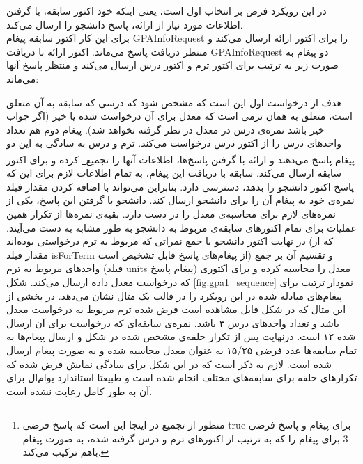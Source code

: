 در این رویکرد فرض بر انتخاب اول است، یعنی اینکه خود اکتور سابقه، با گرفتن اطلاعات مورد نیاز از ارائه، پاسخ دانشجو را ارسال می‌کند.\\
برای این کار اکتور سابقه پیغام GPAInfoRequest را برای اکتور ارائه ارسال می‌کند و منتظر دریافت پاسخ می‌ماند. اکتور ارائه با دریافت GPAInfoRequest دو پیغام به صورت زیر به ترتیب برای اکتور ترم و اکتور درس ارسال می‌کند و منتظر پاسخ آنها می‌ماند:
\begin{latin}
 \begin{description}
 \item[]
  \item[]
 \end{description}
 \end{latin}
هدف از درخواست اول این است که مشخص شود که  درسی که سابقه به آن متعلق است، متعلق به همان ترمی است که معدل برای‌ آن درخواست شده یا خیر (اگر جواب خیر باشد نمره‌ی درس در معدل در نظر گرفته نخواهد شد). پیغام دوم هم تعداد واحد‌های درس را از اکتور درس درخواست می‌کند. ترم و درس به سادگی به این دو پیغام پاسخ می‌دهند و ارائه با گرفتن پاسخ‌ها، اطلاعات آنها را تجمیع\footnote{منظور از تجمیع در اینجا این است که  پاسخ فرضی true برای پیغام  و پاسخ فرضی 3 برای پیغام  را که به ترتیب از اکتورهای ترم و درس گرفته شده، به صورت پیغام  باهم ترکیب می‌کند.} کرده و برای اکتور سابقه ارسال می‌کند.  سابقه با دریافت این پیغام، به تمام اطلاعات لازم برای این که پاسخ اکتور دانشجو را بدهد، دسترسی دارد. بنابراین می‌تواند با اضافه کردن مقدار فیلد نمره‌ی خود به پیغام آن را برای دانشجو ارسال کند. دانشجو با گرفتن این پاسخ، یکی از نمره‌های لازم برای محاسبه‌ی معدل را در دست دارد. بقیه‌ی نمره‌ها از تکرار همین عملیات برای تمام اکتورهای سابقه‌ی مربوط به دانشجو به طور مشابه به دست می‌آیند. در نهایت اکتور دانشجو با جمع نمراتی که مربوط به ترم درخواستی بوده‌اند (که از مقدار فیلد isForTerm از پیغام‌های پاسخ قابل تشخیص است) و تقسیم آن بر جمع واحد‌های مربوط به ترم (فیلد units پیغام پاسخ) معدل را محاسبه کرده و برای اکتوری که درخواست معدل داده ارسال می‌کند.
   شکل \ref{fig:gpa1_sequence} نمودار ترتیب برای پیغام‌های مبادله شده در این رویکرد را در قالب یک مثال نشان می‌دهد. در بخشی از این مثال که در شکل قابل مشاهده است فرض شده ترم مربوط به درخواست معدل باشد و تعداد واحد‌های درس ۳ باشد. نمره‌ی سابقه‌ای که درخواست برای آن ارسال شده ۱۲ است. درنهایت پس از تکرار حلقه‌ی مشخص شده در شکل و ارسال پیغام‌‌ها به تمام سابقه‌ها عدد فرضی ۱۵/۲۵ به عنوان معدل محاسبه شده و به صورت پیغام ارسال شده است. لازم به ذکر است که در این شکل برای سادگی نمایش فرض شده که تکرارهای حلقه برای سابقه‌های مختلف انجام شده است و طبیعتا استاندارد یو‌ام‌ال برای آن به طور کامل رعایت نشده است.

